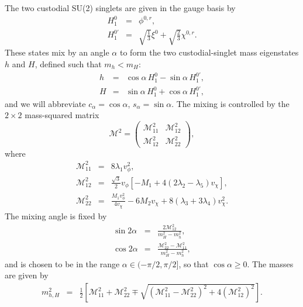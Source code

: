 \documentclass[11pt]{article}
\begin{document}
The two custodial SU(2) singlets are given in the gauge basis by
\begin{eqnarray}
	H_1^0 &=& \phi^{0,r}, \nonumber \\
	H_1^{0 \prime} &=& \sqrt{\frac{1}{3}} \xi^0 + \sqrt{\frac{2}{3}} \chi^{0,r}.
\end{eqnarray}
These states mix by an angle $\alpha$ to form the two custodial-singlet mass eigenstates $h$ and $H$, defined such that $m_h < m_H$:
\begin{eqnarray}
	h &=& \cos \alpha \, H_1^0 - \sin \alpha \, H_1^{0\prime},   \\ \nonumber 
	H &=& \sin \alpha \, H_1^0 + \cos \alpha \, H_1^{0\prime},
\end{eqnarray}
and we will abbreviate $c_{\alpha} = \cos\alpha$, $s_{\alpha} = \sin\alpha$.
The mixing is controlled by the $2\times 2$ mass-squared matrix
\begin{equation}
	\mathcal{M}^2 = \left( \begin{array}{cc}
			\mathcal{M}_{11}^2 & \mathcal{M}_{12}^2 \\
			\mathcal{M}_{12}^2 & \mathcal{M}_{22}^2 \end{array} \right),
\end{equation}
where
\begin{eqnarray}
	\mathcal{M}_{11}^2 &=& 8 \lambda_1 v_{\phi}^2, \nonumber \\
	\mathcal{M}_{12}^2 &=& \frac{\sqrt{3}}{2} v_{\phi} 
	\left[ - M_1 + 4 \left(2 \lambda_2 - \lambda_5 \right) v_{\chi} \right], \nonumber \\
	\mathcal{M}_{22}^2 &=& \frac{M_1 v_{\phi}^2}{4 v_{\chi}} - 6 M_2 v_{\chi} 
	+ 8 \left( \lambda_3 + 3 \lambda_4 \right) v_{\chi}^2.
\end{eqnarray}
The mixing angle is fixed by 
\begin{eqnarray}
	\sin 2 \alpha &=&  \frac{2 \mathcal{M}^2_{12}}{m_H^2 - m_h^2},    \nonumber  \\
	\cos 2 \alpha &=&  \frac{ \mathcal{M}^2_{22} - \mathcal{M}^2_{11}  }{m_H^2 - m_h^2},    
\end{eqnarray}
and is chosen to be in the range $\alpha \in (-\pi/2, \pi/2]$, so that $\cos\alpha \geq 0$.  The masses are given by
\begin{eqnarray}
	m^2_{h,H} &=& \frac{1}{2} \left[ \mathcal{M}_{11}^2 + \mathcal{M}_{22}^2
	\mp \sqrt{\left( \mathcal{M}_{11}^2 - \mathcal{M}_{22}^2 \right)^2 
	+ 4 \left( \mathcal{M}_{12}^2 \right)^2} \right].
	\label{eq:hmass}
\end{eqnarray}
\end{document}
